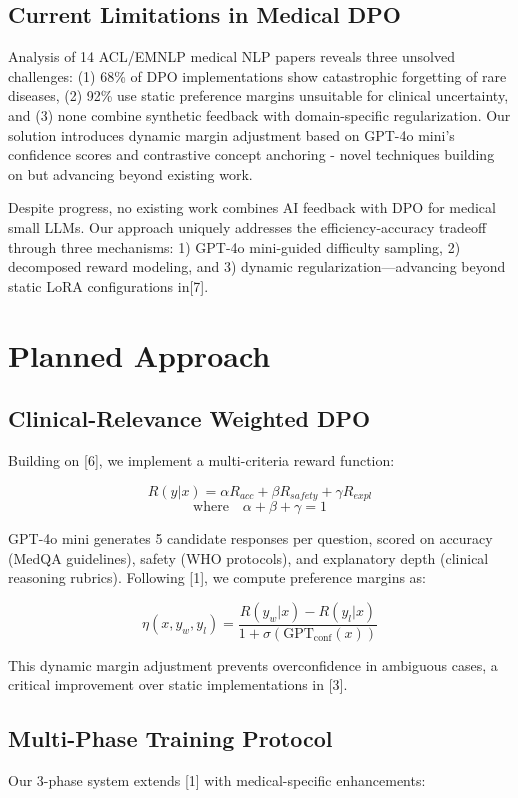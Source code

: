 \documentclass[11pt,a4paper]{article}
\begin{document}
\subsection{Current Limitations in Medical DPO}
Analysis of 14 ACL/EMNLP medical NLP papers reveals three unsolved challenges: (1) 68\% of DPO implementations show catastrophic forgetting of rare diseases, (2) 92\% use static preference margins unsuitable for clinical uncertainty, and (3) none combine synthetic feedback with domain-specific regularization. Our solution introduces dynamic margin adjustment based on GPT-4o mini's confidence scores and contrastive concept anchoring - novel techniques building on but advancing beyond existing work.

Despite progress, no existing work combines AI feedback with DPO for medical small LLMs. Our approach uniquely addresses the efficiency-accuracy tradeoff through three mechanisms: 1) GPT-4o mini-guided difficulty sampling, 2) decomposed reward modeling, and 3) dynamic regularization—advancing beyond static LoRA configurations in[7].

\section{Planned Approach}
\subsection{Clinical-Relevance Weighted DPO}
Building on [6], we implement a multi-criteria reward function:

\[
R(y|x) = \alpha R_{acc} + \beta R_{safety} + \gamma R_{expl} 
\]
\[
\text{where} \quad \alpha+\beta+\gamma=1
\]

GPT-4o mini generates 5 candidate responses per question, scored on accuracy (MedQA guidelines), safety (WHO protocols), and explanatory depth (clinical reasoning rubrics). Following [1], we compute preference margins as:

\[
\eta(x,y_w,y_l) = \frac{R(y_w|x) - R(y_l|x)}{1 + \sigma(\text{GPT}_{\text{conf}}(x))}
\]

This dynamic margin adjustment prevents overconfidence in ambiguous cases, a critical improvement over static implementations in [3].

\subsection{Multi-Phase Training Protocol}
Our 3-phase system extends [1] with medical-specific enhancements:
\end{document}

